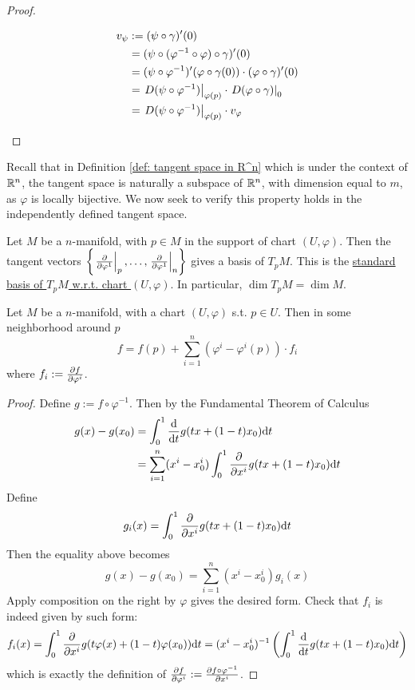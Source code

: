 \documentclass{article}
\begin{document}
\begin{proof}
\begin{itemize}
        \begin{align*}
            v_{\psi}
            & := (\psi \circ \gamma)'(0) \\
            & = (\psi \circ (\varphi^{-1} \circ \varphi) \circ \gamma)'(0) \\
            & = (\psi \circ \varphi^{-1})'(\varphi \circ \gamma(0)) \cdot (\varphi \circ \gamma)'(0) \\
            & = \left.D(\psi \circ \varphi^{-1})\right|_{\varphi(p)} \cdot \left.D(\varphi \circ \gamma)\right|_{0} \\
            & = \left.D(\psi \circ \varphi^{-1})\right|_{\varphi(p)} \cdot v_{\varphi}
        \end{align*}
    \end{itemize}
\end{proof}

Recall that in Definition \ref{def: tangent space in R^n} which is under the context of $\mathbb{R}^n$, the tangent space is naturally a subspace of $\mathbb{R}^n$, with dimension equal to $m$, as $\varphi$ is locally bijective. We now seek to verify this property holds in the independently defined tangent space.

\begin{theorem}\label{thm: dim of tangent space}
    Let $M$ be a $n$-manifold, with $p \in M$ in the support of chart $(U, \varphi)$. Then the tangent vectors $\left\{ \left.\frac{\partial }{\partial \varphi^1}\right|_{p}, \dots, \left.\frac{\partial }{\partial \varphi^1}\right|_{n} \right\}$ gives a basis of $T_pM$. This is the \underline{standard basis of $T_pM$ w.r.t. chart $(U, \varphi)$}. In particular, $\dim T_pM = \dim M$.
\end{theorem}

\begin{lemma}\label{lem: approx of f at p}
    Let $M$ be a $n$-manifold, with a chart $(U, \varphi)$ s.t. $p \in U$. Then in some neighborhood around $p$
    \[
        f = f(p) + \sum_{i = 1}^{n} (\varphi^i - \varphi^i(p)) \cdot f_i
    \]
    where $f_i := \frac{\partial f}{\partial \varphi^i}$.
\end{lemma}

\begin{proof}
    Define $g := f \circ \varphi^{-1}$. Then by the Fundamental Theorem of Calculus
    \begin{align*}
        g(x) - g(x_0) 
        & = \int_{0}^{1} \frac{\mathrm{d} }{\mathrm{d} t} g(t x + (1 - t) x_0) \mathrm{d} t \\
        & = \sum_{i = 1}^{n} (x^i - x_0^i) \int_{0}^{1} \frac{\partial }{\partial x^i} g(t x + (1 - t) x_0) \mathrm{d} t
    \end{align*}
    Define
    \[
        g_i(x) = \int_{0}^{1} \frac{\partial }{\partial x^i} g(t x + (1 - t) x_0) \mathrm{d} t
    \]
    Then the equality above becomes
    \[
        g(x) - g(x_0) = \sum_{i = 1}^{n} (x^i - x_0^i) g_i(x)
    \]
    Apply composition on the right by $\varphi$ gives the desired form. Check that $f_i$ is indeed given by such form:
    \[
        f_i(x) = \int_{0}^{1} \frac{\partial }{\partial x^i} g(t \varphi(x) + (1 - t) \varphi(x_0)) \mathrm{d} t = (x^i - x_0^i)^{-1} \left( \int_{0}^{1} \frac{\mathrm{d} }{\mathrm{d} t} g(t x + (1 - t) x_0) \mathrm{d} t \right)
    \]
    which is exactly the definition of $\frac{\partial f}{\partial \varphi^i} := \frac{\partial f \circ \varphi^{-1}}{\partial x^i}$.
\end{proof}
\end{document}
